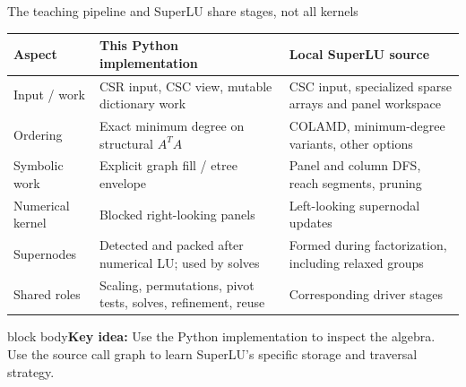 \documentclass[aspectratio=169,10pt]{beamer}
\newcommand{\takeaway}[1]{\vfill\begin{beamercolorbox}[sep=7pt,wd=\textwidth]{block body}\small\textbf{Key idea:} #1\end{beamercolorbox}}
\begin{document}
\begin{frame}{The teaching pipeline and SuperLU share stages, not all kernels}
\small
\begin{tabular}{@{}p{2.5cm}p{5.65cm}p{5.35cm}@{}}
\toprule
\textbf{Aspect} & \textbf{This Python implementation} & \textbf{Local SuperLU source}\\
\midrule
Input / work & CSR input, CSC view, mutable dictionary work & CSC input, specialized sparse arrays and panel workspace\\[5pt]
Ordering & Exact minimum degree on structural $A^TA$ & COLAMD, minimum-degree variants, other options\\[5pt]
Symbolic work & Explicit graph fill / etree envelope & Panel and column DFS, reach segments, pruning\\[5pt]
Numerical kernel & Blocked right-looking panels & Left-looking supernodal updates\\[5pt]
Supernodes & Detected and packed after numerical LU; used by solves & Formed during factorization, including relaxed groups\\[5pt]
Shared roles & Scaling, permutations, pivot tests, solves, refinement, reuse & Corresponding driver stages\\
\bottomrule
\end{tabular}
\takeaway{Use the Python implementation to inspect the algebra. Use the source call graph to learn SuperLU's specific storage and traversal strategy.}
\end{frame}
\end{document}

